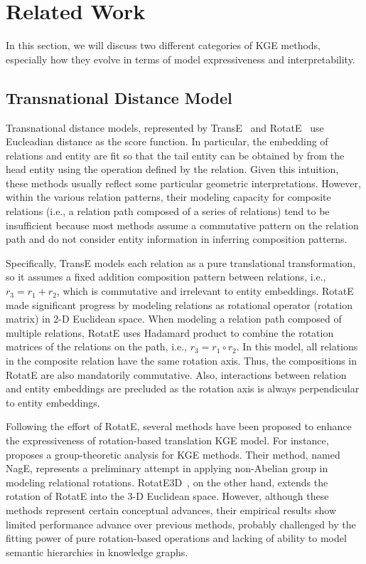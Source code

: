 \documentclass[11pt]{article}
\begin{document}
\section{Related Work}
In this section, we will discuss two different categories of KGE methods, especially how they evolve in terms of model expressiveness and interpretability.

\subsection{Transnational Distance Model}



Transnational distance models, represented by TransE~\cite{bordes2013translating} and RotatE~\cite{sun2019rotate} use Eucleadian distance as the score function. In particular, the embedding of relations and entity are fit so that the tail entity can be obtained by from the head entity using the operation defined by the relation. Given this intuition, these methods usually reflect some particular geometric interpretations. However, within the various relation patterns, their modeling capacity for composite relations (i.e., a relation path composed of a series of relations) tend to be insufficient because most methods assume a commutative pattern on the relation path and do not consider entity information in inferring composition patterns. 

Specifically, TransE models each relation as a pure translational transformation, so it assumes a fixed addition composition pattern between relations, i.e., \(r_3 = r_1 + r_2\), which is commutative and irrelevant to entity embeddings. RotatE made significant progress by modeling relations as rotational operator (rotation matrix) in 2-D Euclidean space. When modeling a relation path composed of multiple relations, RotatE uses Hadamard product to combine the rotation matrices of the relations on the path, i.e., \(r_3 = r_1 \circ r_2\). In this model, all relations in the composite relation have the same rotation axis. Thus, the compositions in RotatE are also mandatorily commutative. Also, interactions between relation and entity embeddings are precluded as the rotation axis is always perpendicular to entity embeddings.

Following the effort of RotatE, several methods have been proposed to enhance the expressiveness of rotation-based translation KGE model. For instance,~\cite{Yang2020AGF} proposes a group-theoretic analysis for KGE methods. Their method, named NagE, represents a preliminary attempt in applying non-Abelian group in modeling relational rotations. RotatE3D~\cite{gao2020rotate3d}, on the other hand, extends the rotation of RotatE into the 3-D Euclidean space. However, although these methods represent certain conceptual advances, their empirical results show limited performance advance over previous methods, probably challenged by the fitting power of pure rotation-based operations and lacking of ability to model semantic hierarchies in knowledge graphs. 
\end{document}
